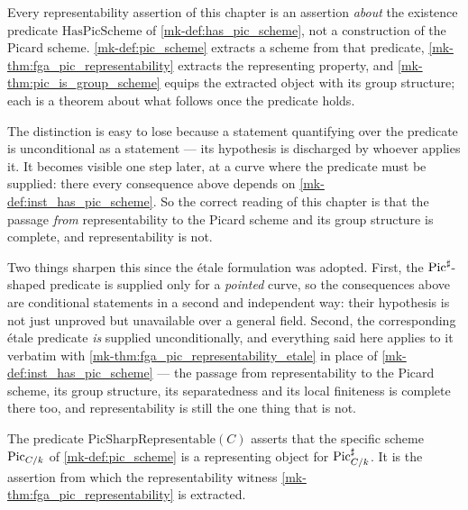 \begin{remark}
  \label{mk-rem:representability_is_conditional}
  Every representability assertion of this chapter is an assertion \emph{about} the
  existence predicate \(\mathrm{HasPicScheme}\) of \ref{mk-def:has_pic_scheme}, not a
  construction of the Picard scheme. \ref{mk-def:pic_scheme} extracts a scheme from that
  predicate, \ref{mk-thm:fga_pic_representability} extracts the representing property, and
  \ref{mk-thm:pic_is_group_scheme} equips the extracted object with its group structure; each
  is a theorem about what follows once the predicate holds.

  The distinction is easy to lose because a statement quantifying over the predicate is
  unconditional as a statement --- its hypothesis is discharged by whoever applies it. It
  becomes visible one step later, at a curve where the predicate must be supplied: there
  every consequence above depends on \ref{mk-def:inst_has_pic_scheme}. So the correct reading
  of this chapter is that the passage \emph{from} representability to the Picard scheme and
  its group structure is complete, and representability is not.

  Two things sharpen this since the \'etale formulation was adopted. First, the
  \(\operatorname{Pic}^\sharp\)-shaped predicate is supplied only for a \emph{pointed} curve, so the
  consequences above are conditional statements in a second and independent way: their
  hypothesis is not just unproved but unavailable over a general field. Second, the
  corresponding \'etale predicate \emph{is} supplied unconditionally, and everything said
  here applies to it verbatim with
  \ref{mk-thm:fga_pic_representability_etale} in place of
  \ref{mk-def:inst_has_pic_scheme} --- the passage from representability to the Picard
  scheme, its group structure, its separatedness and its local finiteness is complete
  there too, and representability is still the one thing that is not.
\end{remark}

\begin{definition}\label{mk-def:pic_sharp_representable}
  \leanok

  The predicate \(\mathrm{PicSharpRepresentable}(C)\) asserts that the specific scheme
  \(\operatorname{Pic}_{C/k}\) of \ref{mk-def:pic_scheme} is a representing object for
  \(\operatorname{Pic}^\sharp_{C/k}\). It is the assertion from which the representability
  witness \ref{mk-thm:fga_pic_representability} is extracted.
\end{definition}

